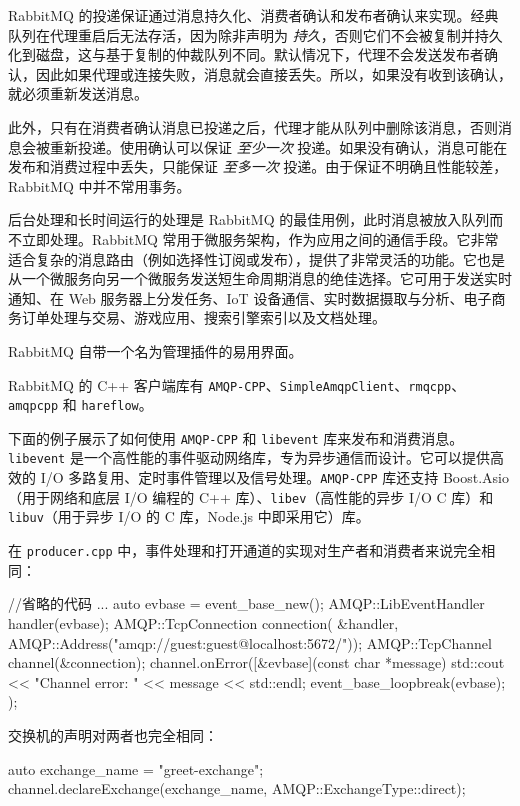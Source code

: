 \label{idx:1561}
\label{idx:1562}
RabbitMQ 的投递保证通过消息持久化、消费者确认和发布者确认来实现。经典队列在代理重启后无法存活，因为除非声明为 \emph{持久}，否则它们不会被复制并持久化到磁盘，这与基于复制的仲裁队列不同。默认情况下，代理不会发送发布者确认，因此如果代理或连接失败，消息就会直接丢失。所以，如果没有收到该确认，就必须重新发送消息。

此外，只有在消费者确认消息已投递之后，代理才能从队列中删除该消息，否则消息会被重新投递。使用确认可以保证 \emph{至少一次} 投递。如果没有确认，消息可能在发布和消费过程中丢失，只能保证 \emph{至多一次} 投递。由于保证不明确且性能较差，RabbitMQ 中并不常用事务。

后台处理和长时间运行的处理是 RabbitMQ 的最佳用例，此时消息被放入队列而不立即处理。RabbitMQ 常用于微服务架构，作为应用之间的通信手段。它非常适合复杂的消息路由（例如选择性订阅或发布），提供了非常灵活的功能。它也是从一个微服务向另一个微服务发送短生命周期消息的绝佳选择。它可用于发送实时通知、在 Web 服务器上分发任务、IoT 设备通信、实时数据摄取与分析、电子商务订单处理与交易、游戏应用、搜索引擎索引以及文档处理。

\label{idx:1563}
RabbitMQ 自带一个名为管理插件的易用界面。

RabbitMQ 的 C++ 客户端库有 \texttt{AMQP-CPP}、\texttt{Simple\allowbreak{}Amqp\allowbreak{}Client}、\texttt{rmqcpp}、\texttt{amqpcpp} 和 \texttt{hareflow}。

下面的例子展示了如何使用 \texttt{AMQP-CPP} 和 \texttt{libevent} 库来发布和消费消息。\texttt{libevent} 是一个高性能的事件驱动网络库，专为异步通信而设计。它可以提供高效的 I/O 多路复用、定时事件管理以及信号处理。\texttt{AMQP-CPP} 库还支持 Boost.Asio（用于网络和底层 I/O 编程的 C++ 库）、\texttt{libev}（高性能的异步 I/O C 库）和 \texttt{libuv}（用于异步 I/O 的 C 库，Node.js 中即采用它）库。

在 \texttt{producer.\allowbreak{}cpp} 中，事件处理和打开通道的实现对生产者和消费者来说完全相同：

\begin{codebox}[cpp]
//省略的代码
...
auto evbase = event_base_new();
AMQP::LibEventHandler handler(evbase);
AMQP::TcpConnection connection(
    &handler, AMQP::Address("amqp://guest:guest@localhost:5672/"));
AMQP::TcpChannel channel(&connection);
channel.onError([&evbase](const char *message) {
  std::cout << "Channel error: " << message << std::endl;
  event_base_loopbreak(evbase);
});
\end{codebox}

交换机的声明对两者也完全相同：

\begin{codebox}[text]
auto exchange_name = "greet-exchange";
channel.declareExchange(exchange_name, AMQP::ExchangeType::direct);
\end{codebox}

